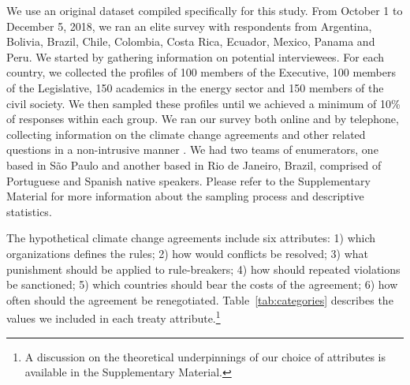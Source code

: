 \documentclass[a4paper,12pt]{article}
\begin{document}
We use an original dataset compiled specifically for this study. From October 1 to December 5, 2018, we ran an elite survey with respondents from Argentina, Bolivia, Brazil, Chile, Colombia, Costa Rica, Ecuador, Mexico, Panama and Peru. We started by gathering information on potential interviewees. For each country, we collected the profiles of 100 members of the Executive, 100 members of the Legislative, 150 academics in the energy sector and 150 members of the civil society. We then sampled these profiles until we achieved a minimum of 10\% of responses within each group. We ran our survey both online and by telephone, collecting information on the climate change agreements and other related questions in a non-intrusive manner \citep{loewen2010help}. We had two teams of enumerators, one based in S\~{a}o Paulo and another based in Rio de Janeiro, Brazil, comprised of Portuguese and Spanish native speakers. Please refer to the Supplementary Material for more information about the sampling process and descriptive statistics.

The hypothetical climate change agreements include six attributes: 1) which organizations defines the rules; 2) how would conflicts be resolved; 3) what punishment should be applied to rule-breakers; 4) how should repeated violations be sanctioned; 5) which countries should bear the costs of the agreement; 6) how often should the agreement be renegotiated. Table~\ref{tab:categories} describes the values we included in each treaty attribute.\footnote{A discussion on the theoretical underpinnings of our choice of attributes is available in the Supplementary Material.}
\end{document}
